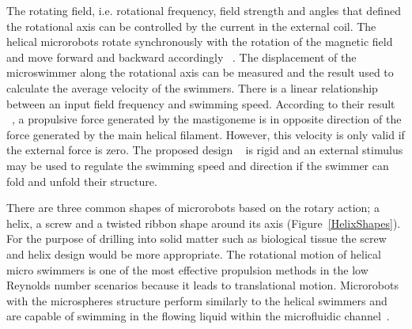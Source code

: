 \documentclass[12pt,a4paper,titlepage]{report}
\begin{document}
 The rotating field, i.e. rotational frequency, field strength and angles that 
defined the rotational axis can be controlled by the current in the external coil. The helical microrobots rotate 
synchronously with the rotation of the magnetic field and move forward and backward accordingly ~\citep{tottori2013artificial}. 
The displacement of the microswimmer along the rotational axis can be measured and the result 
used to calculate the average velocity of the swimmers. There is a linear relationship between an input 
field frequency and swimming speed. According to their result ~\citep{tottori2013artificial}, a propulsive force generated by 
the mastigoneme is in opposite direction of the force generated by the main helical filament. 
However, this velocity is only valid if the external force is zero. The proposed 
design ~\citep{tottori2013artificial} is rigid and an external stimulus may be used to regulate the swimming
 speed and direction if the swimmer can fold and unfold their structure. 


There are three common shapes of microrobots 
based on the rotary action; a helix, a screw and a twisted ribbon shape around its
 axis (Figure~\ref{HelixShapes}). For the purpose of drilling into solid matter such as biological tissue the screw and helix 
design would be more appropriate. The rotational motion of helical micro
 swimmers is one of the most effective propulsion methods in the low Reynolds number scenarios 
because it leads to translational motion. Microrobots with the microspheres structure perform similarly 
to the helical swimmers and are capable of swimming in the flowing liquid within the microfluidic channel~\citep{kim2013fabrication}. 
\end{document}
